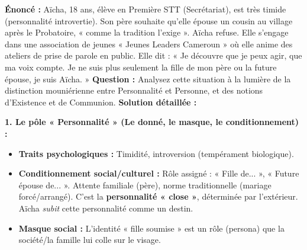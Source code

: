\documentclass[11pt]{article}
\begin{document}
\begin{exoresolu}
\textbf{Énoncé :} Aïcha, 18 ans, élève en Première STT (Secrétariat), est très timide (personnalité introvertie). Son père souhaite qu'elle épouse un cousin au village après le Probatoire, « comme la tradition l'exige ». Aïcha refuse. Elle s'engage dans une association de jeunes « Jeunes Leaders Cameroun » où elle anime des ateliers de prise de parole en public. Elle dit : « Je découvre que je peux agir, que ma voix compte. Je ne suis plus seulement la fille de mon père ou la future épouse, je suis Aïcha. »
\textbf{Question :} Analysez cette situation à la lumière de la distinction mouniérienne entre Personnalité et Personne, et des notions d'Existence et de Communion.
\tcblower
\textbf{Solution détaillée :}

\textbf{1. Le pôle « Personnalité » (Le donné, le masque, le conditionnement) :}
\begin{itemize}
    \item \textbf{Traits psychologiques :} Timidité, introversion (tempérament biologique).
    \item \textbf{Conditionnement social/culturel :} Rôle assigné : « Fille de... », « Future épouse de... ». Attente familiale (père), norme traditionnelle (mariage forcé/arrangé). C'est la \textbf{personnalité « close »}, déterminée par l'extérieur. Aïcha \emph{subit} cette personnalité comme un destin.
    \item \textbf{Masque social :} L'identité « fille soumise » est un rôle (persona) que la société/la famille lui colle sur le visage.
\end{itemize}


\end{exoresolu}
\end{document}
